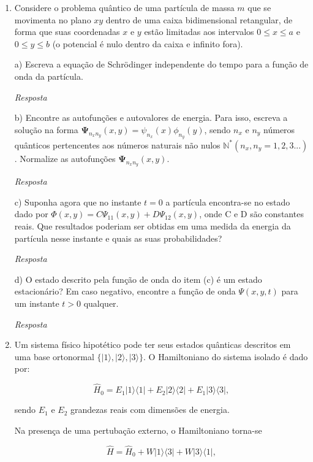 \begin{enumerate}[start=1,label={\bfseries Q\arabic*.}]
{}




\item Considere o problema quântico de uma partícula de massa $m$ que se movimenta no plano $xy$ dentro de uma caixa bidimensional retangular, de forma que suas coordenadas $x$ e $y$ estão limitadas aos intervalos $0 \leq x \leq a$ e $0 \leq y \leq b$ (o potencial é nulo dentro da caixa e infinito fora).


  a) Escreva a equação de Schrödinger independente do tempo para a função de onda da partícula.

  \textit{Resposta}

  b) Encontre as autofunções e autovalores de energia. Para isso, escreva a solução na forma $\mathbf{\Psi}_{n_{x}n_{y}} (x,y) = \psi_{n_{x}}(x) \phi_{n_{y}}(y)$, sendo $n_{x}$ e $n_{y}$ números quânticos pertencentes aos números naturais não nulos $\mathbb{N}^{*} \left( n_{x}, n_{y} = 1,2,3... \right)$. Normalize as autofunções $\mathbf{\Psi}_{n_{x}n_{y}} (x,y)$.

  \textit{Resposta}

  c) Suponha agora que no instante $t=0$ a partícula encontra-se no estado dado por $\Phi(x,y) = C \Psi_{11}(x,y) + D \Psi_{12}(x,y)$, onde C e D são constantes reais. Que resultados poderiam ser obtidas em uma medida da energia da partícula nesse instante e quais as suas probabilidades?

  \textit{Resposta}

  d) O estado descrito pela função de onda do item (c) é um estado estacionário? Em caso negativo, encontre a função de onda $\Psi(x,y,t)$ para um  instante $t > 0$ qualquer.

  \textit{Resposta}




\item Um sistema físico hipotético pode ter seus estados quânticas descritos em uma base ortonormal $\{ |1 \rangle, |2 \rangle, |3 \rangle \}$. O Hamiltoniano do sistema isolado é dado por:

$$
\hat{H}_{0} = E_{1} |1\rangle \langle 1| + E_{2} |2\rangle \langle 2| + E_{1} |3\rangle \langle 3|,
$$

sendo $E_{1}$ e $E_{2}$ grandezas reais com dimensões de energia.

Na presença de uma pertubação externo, o Hamiltoniano torna-se

$$
\hat{H} = \hat{H}_{0} + W |1\rangle \langle 3| + W |3\rangle \langle 1|,
$$


\end{enumerate}
